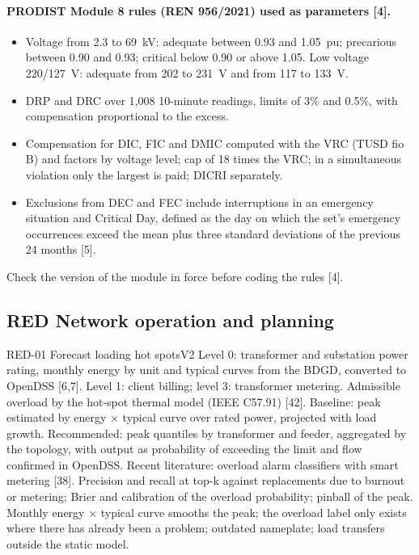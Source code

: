 \paragraph{PRODIST Module 8 rules (REN 956/2021) used as parameters [4].}
\begin{itemize}
  \item Voltage from 2.3 to 69~kV: adequate between 0.93 and 1.05~pu; precarious
    between 0.90 and 0.93; critical below 0.90 or above 1.05. Low voltage
    220/127~V: adequate from 202 to 231~V and from 117 to 133~V.
  \item DRP and DRC over 1,008 10-minute readings, limits of 3\% and 0.5\%,
    with compensation proportional to the excess.
  \item Compensation for DIC, FIC and DMIC computed with the VRC (TUSD fio B)
    and factors by voltage level; cap of 18 times the VRC; in a simultaneous
    violation only the largest is paid; DICRI separately.
  \item Exclusions from DEC and FEC include interruptions in an emergency
    situation and Critical Day, defined as the day on which the set's
    emergency occurrences exceed the mean plus three standard deviations of
    the previous 24 months [5].
\end{itemize}
Check the version of the module in force before coding the rules [4].

\subsection{RED \textperiodcentered{} Network operation and planning}

\begin{ficha}{RED-01 \textperiodcentered{} Forecast loading hot spots}{V2}
 Level 0: transformer and substation power rating, monthly
energy by unit and typical curves from the BDGD, converted to OpenDSS [6,7].
Level 1: client billing; level 3: transformer metering.
Admissible overload by the hot-spot thermal model (IEEE C57.91) [42].
 Baseline: peak estimated by energy × typical curve
over rated power, projected with load growth. Recommended:
peak quantiles by transformer and feeder, aggregated by the topology,
with output as probability of exceeding the limit and flow confirmed in
OpenDSS. Recent literature: overload alarm classifiers with smart
metering [38].
 Precision and recall at top-k against replacements due to
burnout or metering; Brier and calibration of the overload probability; pinball
of the peak.
 Monthly energy × typical curve smooths the peak; the
overload label only exists where there has already been a problem; outdated
nameplate; load transfers outside the static model.
\end{ficha}

